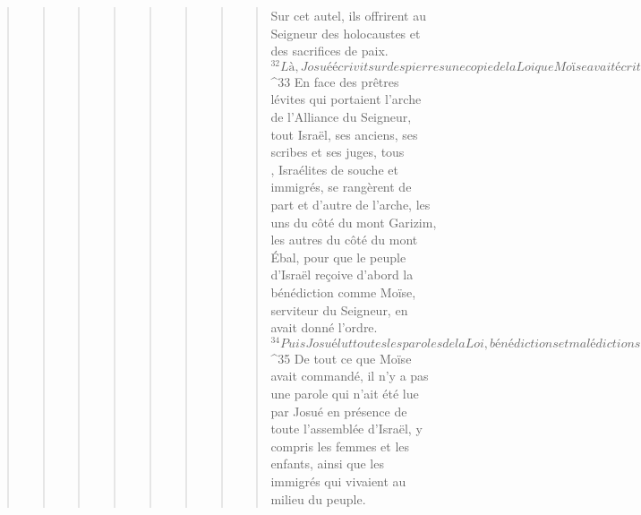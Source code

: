 \begin{verse}
\begin{verse}
\begin{verse}
\begin{verse}
\begin{verse}
\begin{verse}
\begin{verse}
\begin{verse}
      Sur cet autel, ils offrirent au Seigneur des holocaustes et des sacrifices de paix. 
${}^{32} Là, Josué écrivit sur des pierres une copie de la Loi que Moïse avait écrite en présence des fils d’Israël. 
${}^{33} En face des prêtres lévites qui portaient l’arche de l’Alliance du Seigneur, tout Israël, ses anciens, ses scribes et ses juges, tous\\, Israélites de souche et immigrés, se rangèrent de part et d’autre de l’arche, les uns du côté du mont Garizim, les autres du côté du mont Ébal, pour que le peuple d’Israël reçoive d’abord la bénédiction comme Moïse, serviteur du Seigneur, en avait donné l’ordre. 
${}^{34} Puis Josué lut toutes les paroles de la Loi, bénédictions et malédictions, tout ce qui est écrit dans le livre de la Loi. 
${}^{35} De tout ce que Moïse avait commandé, il n’y a pas une parole qui n’ait été lue par Josué en présence de toute l’assemblée d’Israël, y compris les femmes et les enfants, ainsi que les immigrés qui vivaient au milieu du peuple.
      

\end{verse}
\end{verse}
\end{verse}
\end{verse}
\end{verse}
\end{verse}
\end{verse}
\end{verse}
